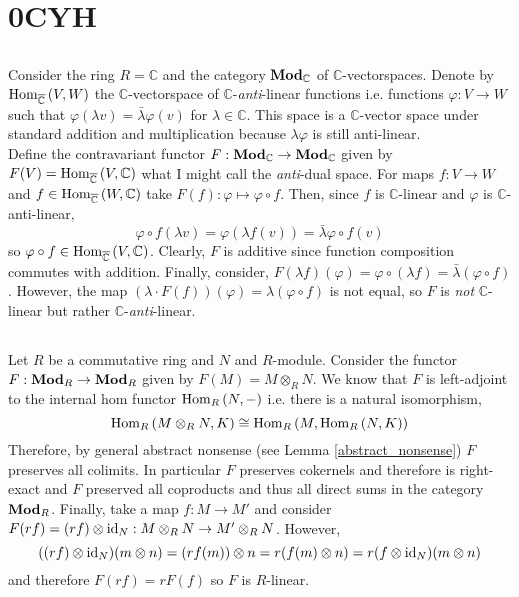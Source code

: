 \documentclass[12pt]{article}
\begin{document}
\section{0CYH}

\subsection{}
\renewcommand{\C}{\mathbb{C}}

Consider the ring $R = \C$ and the category $\Mod{\C}$ of $\C$-vectorspaces. Denote by $\Homover{\overline{\C}}{V}{W}$ the $\C$-vectorspace of $\C$-\textit{anti}-linear functions i.e. functions $\varphi : V \to W$ such that $\varphi(\lambda v) = \bar{\lambda} \varphi(v)$ for $\lambda \in \C$. This space is a $\C$-vector space under standard addition and multiplication because $\lambda \varphi$ is still anti-linear.
\bigskip\\
Define the contravariant functor $F : \Mod{\C} \to \Mod{\C}$ given by $F(V) = \Homover{\overline{\C}}{V}{\C}$ what I might call the \textit{anti}-dual space. For maps $f : V \to W$ and $f \in \Homover{\overline{\C}}{W}{\C}$ take $F(f) : \varphi \mapsto \varphi \circ f$. Then, since $f$ is $\C$-linear and $\varphi$ is $\C$-anti-linear, 
\[ \varphi \circ f(\lambda v) = \varphi(\lambda f(v)) = \bar{\lambda} \varphi \circ f(v) \]
so $\varphi \circ f \in \Homover{\overline{\C}}{V}{\C}$. Clearly, $F$ is additive since function composition commutes with addition. Finally, consider, $F(\lambda f)(\varphi) = \varphi \circ (\lambda f) = \bar{\lambda} (\varphi \circ f)$. However, the map $(\lambda \cdot F(f))(\varphi) = \lambda (\varphi \circ f)$ is not equal, so $F$ is \textit{not} $\C$-linear but rather $\C$-\textit{anti}-linear.

\renewcommand{\C}{\mathcal{C}}

\subsection{}

Let $R$ be a commutative ring and $N$ and $R$-module. Consider the functor $F : \mathbf{Mod}_{R} \to \mathbf{Mod}_{R}$ given by $F(M) = M \otimes_R N$. We know that $F$ is left-adjoint to the internal hom functor $\mathrm{Hom}_{R} \left( N, - \right)$ i.e. there is a natural isomorphism,
\[ \mathrm{Hom}_{R} \left( M \otimes_R N, K \right) \cong \mathrm{Hom}_{R} \left( M, \mathrm{Hom}_{R} \left( N, K \right) \right) \]
Therefore, by general abstract nonsense (see Lemma \ref{abstract_nonsense}) $F$ preserves all colimits. In particular $F$ preserves cokernels and therefore is right-exact and $F$ preserved all coproducts and thus all direct sums in the category $\mathbf{Mod}_{R}$. Finally, take a map $f : M \to M'$ and consider $F(rf) = (rf) \otimes \mathrm{id}_N : M \otimes_R N \to M' \otimes_R N$. However, 
\[ ((rf) \otimes \mathrm{id}_N)(m \otimes n) = (rf(m)) \otimes n = r(f(m) \otimes n) = r (f \otimes \mathrm{id}_N)(m \otimes n) \]
and therefore $F(rf) = r F(f)$ so $F$ is $R$-linear.  
\end{document}

